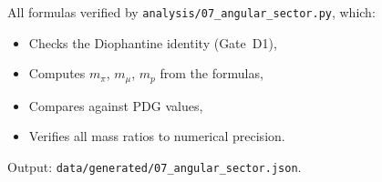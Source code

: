 \documentclass[11pt,letterpaper]{article}
\numberwithin{equation}{section}
\begin{document}
All formulas verified by \texttt{analysis/07\_angular\_sector.py}, which:
\begin{itemize}
  \item Checks the Diophantine identity (Gate~D1),
  \item Computes $m_\pi$, $m_\mu$, $m_p$ from the formulas,
  \item Compares against PDG values,
  \item Verifies all mass ratios to numerical precision.
\end{itemize}

Output: \texttt{data/generated/07\_angular\_sector.json}.
\end{document}
